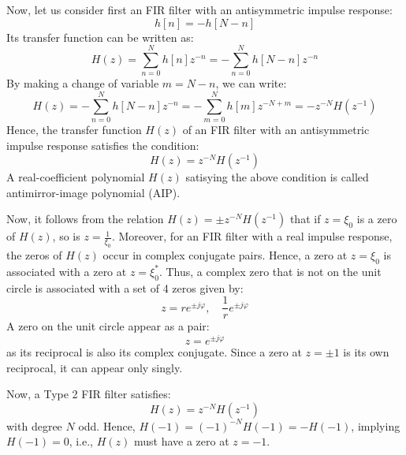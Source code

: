 \documentclass[../../main/main.tex]{subfiles}
\begin{document}
Now, let us consider first an FIR filter with an antisymmetric impulse response:
\begin{equation}
    h[n]
    =
    -h[N-n]
    \label{eq:L20_S45_1}
\end{equation}
Its transfer function can be written as:
\begin{equation}
    H(z)
    =
    \sum_{n=0}^{N} h[n]z^{-n}
    =
    - \sum_{n=0}^{N} h[N-n]z^{-n}
    \label{eq:L20_S45_2}
\end{equation}
By making a change of variable \( m = N - n \), we can write:
\begin{equation}
    H(z)
    =
    - \sum_{n=0}^{N} h[N-n]z^{-n}
    =
    - \sum_{m=0}^{N} h[m]z^{-N+m}
    =
    - z^{-N} H(z^{-1})
    \label{eq:L20_S45_3}
\end{equation}
Hence, the transfer function \( H(z) \) of an FIR filter with an antisymmetric impulse response satisfies the condition:
\begin{equation}
    H(z)
    =
    z^{-N} H(z^{-1})
    \label{eq:L20_S46_1}
\end{equation}
A real-coefficient polynomial \( H(z) \) satisying the above condition is called antimirror-image polynomial (AIP).

Now, it follows from the relation \( H(z) = \pm z^{-N} H(z^{-1}) \) that if \( z = \xi_{0} \) is a zero of \( H(z) \), so is \( z = \frac{1}{\xi_{0}} \). Moreover, for an FIR filter with a real impulse response, the zeros of \( H(z) \) occur in complex conjugate pairs. Hence, a zero at \( z = \xi_{0} \) is associated with a zero at \( z = \xi^{*}_{0} \).
Thus, a complex zero that is not on the unit circle is associated with a set of 4 zeros given by:
\begin{equation}
    z
    =
    re^{\pm j \varphi},
    \quad
    \frac{1}{r} e^{\pm j \varphi}
    \label{eq:L20_S48_1}
\end{equation}
A zero on the unit circle appear as a pair:
\begin{equation}
    z
    =
    e^{\pm j \varphi}
    \label{eq:L20_S48_2}
\end{equation}
as its reciprocal is also its complex conjugate. Since a zero at \( z = \pm 1 \) is its own reciprocal, it can appear only singly.

Now, a Type 2 FIR filter satisfies:
\begin{equation}
    H(z)
    =
    z^{-N} H(z^{-1})
    \label{eq:L20_S49_1}
\end{equation}
with degree \( N \) odd. Hence, \( H(-1) = (-1)^{-N} H(-1) = - H(-1) \), implying \( H(-1) = 0 \), i.e., \( H(z) \) must have a zero at \( z = -1 \).
\end{document}
